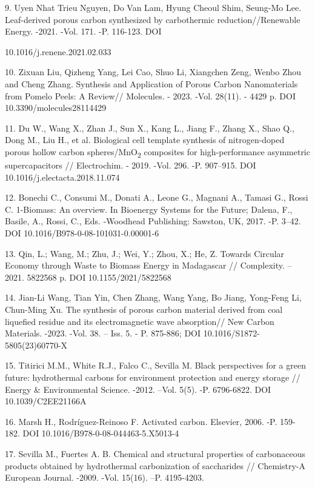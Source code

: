 \begin{noparindent}
9. Uyen Nhat Trieu Nguyen, Do Van Lam, Hyung Cheoul Shim, Seung-Mo Lee.
  Leaf-derived porous carbon synthesized by carbothermic
  reduction//Renewable Energy. -2021. -Vol. 171. -P. 116-123. DOI

  10.1016/j.renene.2021.02.033

10. Zixuan Liu, Qizheng Yang, Lei Cao, Shuo Li, Xiangchen Zeng, Wenbo Zhou
  and Cheng Zhang. Synthesis and Application of Porous Carbon
  Nanomaterials from Pomelo Peels: A Review// Molecules. - 2023. -Vol.
  28(11). - 4429 p. DOI 10.3390/molecules28114429

11. Du W., Wang X., Zhan J., Sun X., Kang L., Jiang F., Zhang X., Shao Q.,
  Dong M., Liu H., et al. Biological cell template synthesis of
  nitrogen-doped porous hollow carbon spheres/MnO\textsubscript{2}
  composites for high-performance asymmetric supercapacitors //
  Electrochim. - 2019. -Vol. 296. -P. 907--915. DOI
  10.1016/j.electacta.2018.11.074

12. Bonechi C., Consumi M., Donati A., Leone G., Magnani A., Tamasi G.,
  Rossi C. 1-Biomass: An overview. In Bioenergy Systems for the Future;
  Dalena, F., Basile, A., Rossi, C., Eds. -Woodhead Publishing: Sawston,
  UK, 2017. -P. 3--42. DOI 10.1016/B978-0-08-101031-0.00001-6

13. Qin, L.; Wang, M.; Zhu, J.; Wei, Y.; Zhou, X.; He, Z. Towards Circular
  Economy through Waste to Biomass Energy in Madagascar // Complexity.
  -- 2021. 5822568 p. DOI 10.1155/2021/5822568

14. Jian-Li Wang, Tian Yin, Chen Zhang, Wang Yang, Bo Jiang, Yong-Feng Li,
  Chun-Ming Xu. The synthesis of porous carbon material derived from
  coal liquefied residue and its electromagnetic wave absorption// New
  Carbon Materials. -2023. -Vol. 38. -- Iss. 5. - P. 875-886; DOI
  10.1016/S1872-5805(23)60770-X

15. Titirici M.M., White R.J., Falco C., Sevilla M. Black perspectives for
  a green future: hydrothermal carbons for environment protection and
  energy storage // Energy \& Environmental Science. -2012. --Vol. 5(5).
  -P. 6796-6822. DOI 10.1039/C2EE21166A

16. Marsh H., Rodríguez-Reinoso F. Activated carbon. Elsevier, 2006. -P.
  159-182. DOI 10.1016/B978-0-08-044463-5.X5013-4

17. Sevilla M., Fuertes A. B. Chemical and structural properties of
  carbonaceous products obtained by hydrothermal carbonization of
  saccharides // Chemistry-A European Journal. -2009. -Vol. 15(16). --P.
  4195-4203.


\end{noparindent}
